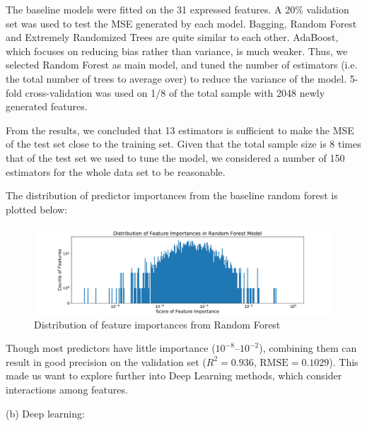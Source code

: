 \documentclass[11pt]{article}
\begin{document}
The baseline models were fitted on the 31 expressed features. A 20\% validation set was used to test the MSE generated by each model. Bagging, Random Forest and Extremely Randomized Trees are quite similar to each other. AdaBoost, which focuses on reducing bias rather than variance, is much weaker. Thus, we selected Random Forest as main model, and tuned the number of estimators (i.e. the total number of trees to average over) to reduce the variance of the model. 5-fold cross-validation was used on 1/8 of the total sample with 2048 newly generated features. 

From the results, we concluded that 13 estimators is sufficient to make the MSE of the test set close to the training set. Given that the total sample size is 8 times that of the test set we used to tune the model, we considered a number of 150 estimators for the whole data set to be reasonable.

The distribution of predictor importances from the baseline random forest is plotted below:

\begin{figure}[H]
\centering
\includegraphics[width=\textwidth]{his_feature_importance}
\caption{Distribution of feature importances from Random Forest}
\label{fig:his_feature_importance}
\end{figure}

Though most predictors have little importance ($10^{-8}$--$10^{-2}$), combining them can result in good precision on the validation set ($R^2 = 0.936$, $\textrm{RMSE}=0.1029$). This made us want to explore further into Deep Learning methods, which consider interactions among features.

(b) Deep learning: 

\end{document}
